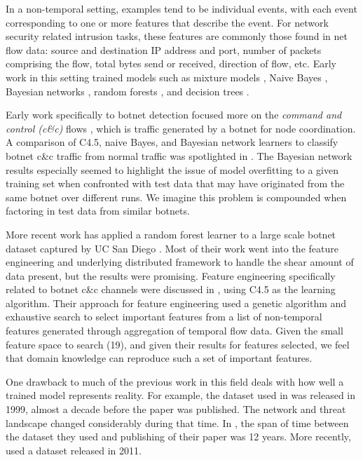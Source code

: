 \documentclass[letterpaper]{article}
\begin{document}
In a non-temporal setting, examples tend to be individual events, with each event corresponding to one or more features that describe the event.  For network security related intrusion tasks, these features are commonly those found in net flow data: source and destination IP address and port, number of packets comprising the flow, total bytes send or received, direction of flow, etc.  Early work in this setting trained models such as mixture models \cite{Puttini02bayesianclassification}, Naive Bayes \cite{10.1007/978-3-642-00670-8_9}, Bayesian networks \cite{1254306,Xu:2010:IDU:1946417.1946434}, random forests \cite{Zhang:2008:RNI:2220436.2221144}, and decision trees \cite{Osanaiye2016}.

Early work specifically to botnet detection focused more on the \emph{command and control (c\&c)} flows \cite{4116687,Gu2008BotSnifferDB,Cho:2010:IAF:1866307.1866355,EURECOM+3886,DIETRICH2013475}, which is traffic generated by a botnet for node coordination.   A comparison of C4.5, naive Bayes, and Bayesian network learners to classify botnet c\&c traffic from normal traffic was spotlighted in \cite{4116687}.  The Bayesian network results especially seemed to highlight the issue of model overfitting to a given training set when confronted with test data that may have originated from the same botnet over different runs.  We imagine this problem is compounded when factoring in test data from similar botnets.

More recent work has applied a random forest learner to a large scale botnet dataset captured by UC San Diego \cite{SINGH2014488}.  Most of their work went into the feature engineering and underlying distributed framework to handle the shear amount of data present, but the results were promising.  Feature engineering specifically related to botnet c&c channels were discussed in \cite{7891834}, using C4.5 as the learning algorithm.  Their approach for feature engineering used a genetic algorithm and exhaustive search to select important features from a list of non-temporal features generated through aggregation of temporal flow data.  Given the small feature space to search (19), and given their results for features selected, we feel that domain knowledge can reproduce such a set of important features.

One drawback to much of the previous work in this field deals with how well a trained model represents reality.  For example, the dataset used in \cite{Zhang:2008:RNI:2220436.2221144} was released in 1999, almost a decade before the paper was published.  The network and threat landscape changed considerably during that time.  In \cite{Xu:2010:IDU:1946417.1946434}, the span of time between the dataset they used and publishing of their paper was 12 years.  More recently, \cite{7891834} used a dataset released in 2011.
\end{document}
